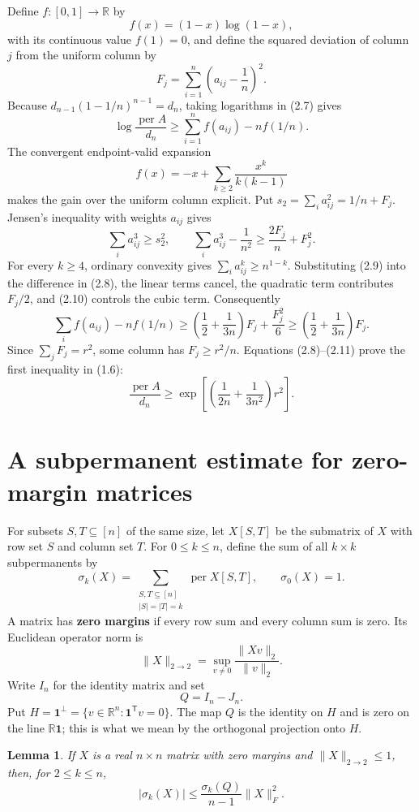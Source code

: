 \documentclass[11pt]{article}
\newtheorem{lemma}[theorem]{Lemma}
\begin{document}
Define $f:[0,1]\to\mathbb R$ by
\[
f(x)=(1-x)\log(1-x),
\]
with its continuous value $f(1)=0$, and define the squared deviation of
column $j$ from the uniform column by
\[
F_j=\sum_{i=1}^n\left(a_{ij}-\frac1n\right)^2.
\]
Because $d_{n-1}(1-1/n)^{n-1}=d_n$, taking logarithms in (2.7) gives
\[
\log\frac{\operatorname{per}A}{d_n}
\ge\sum_{i=1}^n f(a_{ij})-nf(1/n).
\tag{2.8}
\]
The convergent endpoint-valid expansion
\[
f(x)=-x+\sum_{k\ge2}\frac{x^k}{k(k-1)}
\tag{2.9}
\]
makes the gain over the uniform column explicit. Put
$s_2=\sum_i a_{ij}^2=1/n+F_j$. Jensen's inequality with weights $a_{ij}$
gives
\[
\sum_i a_{ij}^3\ge s_2^2,
\qquad
\sum_i a_{ij}^3-\frac1{n^2}
\ge\frac{2F_j}{n}+F_j^2.
\tag{2.10}
\]
For every $k\ge4$, ordinary convexity gives
$\sum_i a_{ij}^k\ge n^{1-k}$. Substituting (2.9) into the difference in (2.8),
the linear terms cancel, the quadratic term contributes $F_j/2$, and (2.10)
controls the cubic term. Consequently
\[
\sum_i f(a_{ij})-nf(1/n)
\ge\left(\frac12+\frac1{3n}\right)F_j+\frac{F_j^2}{6}
\ge\left(\frac12+\frac1{3n}\right)F_j.
\tag{2.11}
\]
Since $\sum_jF_j=r^2$, some column has $F_j\ge r^2/n$. Equations
(2.8)--(2.11) prove the first inequality in (1.6):
\[
\frac{\operatorname{per}A}{d_n}\ge
\exp\!\left[\left(\frac1{2n}+\frac1{3n^2}\right)r^2\right].
\tag{2.12}
\]
\section{A subpermanent estimate for zero-margin matrices}

For subsets $S,T\subseteq[n]$ of the same size, let $X[S,T]$ be the
submatrix of $X$ with row set $S$ and column set $T$. For $0\le k\le n$,
define the sum of all $k\times k$ subpermanents by
\[
\sigma_k(X)=
\sum_{\substack{S,T\subseteq[n]\\ |S|=|T|=k}}
\operatorname{per}X[S,T],
\qquad \sigma_0(X)=1.
\tag{3.1}
\]
A matrix has \textbf{zero margins} if every row sum and every column sum is zero.
Its Euclidean operator norm is
\[
\|X\|_{2\to2}=\sup_{v\ne0}\frac{\|Xv\|_2}{\|v\|_2}.
\]
Write $I_n$ for the identity matrix and set
\[
Q=I_n-J_n.
\]
Put
$H=\mathbf1^\perp=\{v\in\mathbb R^n:\mathbf1^{\mathsf T}v=0\}$. The map
$Q$ is the identity on $H$ and is zero on the line
$\mathbb R\mathbf1$; this is what we mean by the orthogonal projection onto
$H$.

\begin{lemma}
If $X$ is a real $n\times n$ matrix with zero margins and
$\|X\|_{2\to2}\le1$, then, for
$2\le k\le n$,
\[
|\sigma_k(X)|\le
\frac{\sigma_k(Q)}{n-1}\|X\|_F^2.
\tag{3.2}
\]
\end{lemma}
\end{document}
